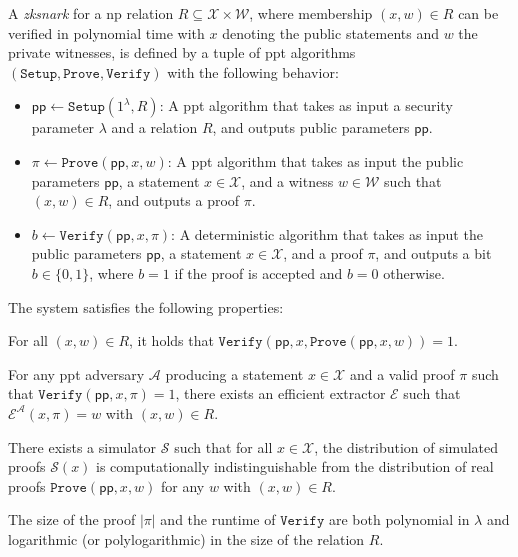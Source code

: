 \begin{definition}
	A \textit{\acrshort{zksnark}} for a \acrfull{np} relation $R \subseteq \mathcal{X} \times \mathcal{W}$, where membership $(x, w) \in R$ can be verified in polynomial time with $x$ denoting the public statements and $w$ the private witnesses, is defined by a tuple of \acrshort{ppt} algorithms $(\texttt{Setup}, \texttt{Prove}, \texttt{Verify})$ with the following behavior:
	
	\begin{itemize}
		\item $\mathsf{pp} \leftarrow \texttt{Setup}(1^\lambda, R)$: A \acrshort{ppt} algorithm that takes as input a security parameter $\lambda$ and a relation $R$, and outputs public parameters $\mathsf{pp}$.
		
		\item $\pi \leftarrow \texttt{Prove}(\mathsf{pp}, x, w)$: A \acrshort{ppt} algorithm that takes as input the public parameters $\mathsf{pp}$, a statement $x \in \mathcal{X}$, and a witness $w \in \mathcal{W}$ such that $(x, w) \in R$, and outputs a proof $\pi$.
		
		\item $b \leftarrow \texttt{Verify}(\mathsf{pp}, x, \pi)$: A deterministic algorithm that takes as input the public parameters $\mathsf{pp}$, a statement $x \in \mathcal{X}$, and a proof $\pi$, and outputs a bit $b \in \{0,1\}$, where $b = 1$ if the proof is accepted and $b = 0$ otherwise.
	\end{itemize}
	
	The system satisfies the following properties:
	\begin{description}[leftmargin=0cm]
		\item[Completeness:] For all $(x, w) \in R$, it holds that $\texttt{Verify}(\mathsf{pp}, x, \texttt{Prove}(\mathsf{pp}, x, w)) = 1$.
		\item[Knowledge soundness:] For any \acrshort{ppt} adversary $\mathcal{A}$ producing a statement $x \in \mathcal{X}$ and a valid proof $\pi$ such that $\texttt{Verify}(\mathsf{pp}, x, \pi) = 1$, there exists an efficient extractor $\mathcal{E}$ such that $\mathcal{E}^{\mathcal{A}}(x, \pi) = w$ with $(x, w) \in R$.
		\item[Zero-knowledge:] There exists a simulator $\mathcal{S}$ such that for all $x \in \mathcal{X}$, the distribution of simulated proofs $\mathcal{S}(x)$ is computationally indistinguishable from the distribution of real proofs $\texttt{Prove}(\mathsf{pp}, x, w)$ for any $w$ with $(x, w) \in R$.
		\item[Succinctness:] The size of the proof $|\pi|$ and the runtime of $\texttt{Verify}$ are both polynomial in $\lambda$ and logarithmic (or polylogarithmic) in the size of the relation $R$.
	\end{description}
	\label{def:zksnark}
\end{definition}

